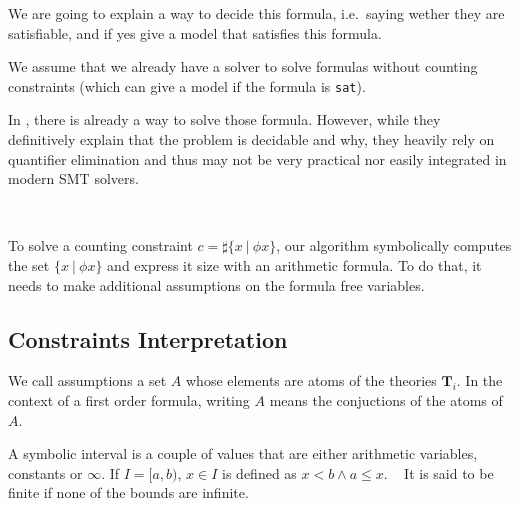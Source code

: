 \documentclass[]{article}
\begin{document}
We are going to explain a way to decide this formula, i.e.~saying wether
they are satisfiable, and if yes give a model that satisfies this
formula.

We assume that we already have a solver to solve formulas without
counting constraints (which can give a model if the formula is
\texttt{sat}).

In \cite{AlbertiGP16, schweikardt}, there is already a way to solve
those formula. However, while they definitively explain that the problem
is decidable and why, they heavily rely on quantifier elimination and
thus may not be very practical nor easily integrated in modern SMT
solvers.

~

To solve a counting constraint $c = \sharp\{x\ |\ \phi{x}\}$, our
algorithm symbolically computes the set $\{x\ |\ \phi{x}\}$ and
express it size with an arithmetic formula. To do that, it needs to make
additional assumptions on the formula free variables.

\subsection{Constraints
Interpretation}\label{constraints-interpretation}

\begin{definition}[Assumptions]

We call assumptions a set $A$ whose elements are atoms of the theories
$\mathbf{T}_i$. In the context of a first order formula, writing $A$
means the conjuctions of the atoms of $A$.

\label{assumptions}

\end{definition}

\vspace{3mm}

\begin{definition}

A symbolic interval is a couple of values that are either arithmetic
variables, constants or $\infty$. If $I = [a, b)$, $x \in I$ is
defined as $x < b \land a \le x$. \newline~\newline
It is said to be finite if none of the bounds are infinite.

\label{symbolic}

\end{definition}

\vspace{3mm}
\end{document}
